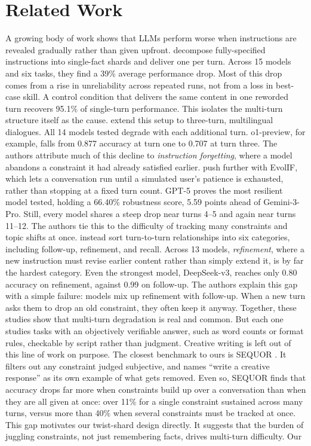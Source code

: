 \section{Related Work}
\label{sec:related_work}

A growing body of work shows that LLMs perform worse when instructions are revealed gradually rather than given upfront. \citet{laban2025llmslostmultiturnconversation} decompose fully-specified instructions into single-fact shards and deliver one per turn. Across 15 models and six tasks, they find a 39\% average performance drop. Most of this drop comes from a rise in unreliability across repeated runs, not from a loss in best-case skill. A control condition that delivers the same content in one reworded turn recovers 95.1\% of single-turn performance. This isolates the multi-turn structure itself as the cause. \citet{he2024multiifbenchmarkingllmsmultiturn} extend this setup to three-turn, multilingual dialogues. All 14 models tested degrade with each additional turn. o1-preview, for example, falls from 0.877 accuracy at turn one to 0.707 at turn three. The authors attribute much of this decline to \textit{instruction forgetting}, where a model abandons a constraint it had already satisfied earlier. \citet{jia2026battleanotherprobingllms} push further with EvolIF, which lets a conversation run until a simulated user's patience is exhausted, rather than stopping at a fixed turn count. GPT-5 proves the most resilient model tested, holding a 66.40\% robustness score, 5.59 points ahead of Gemini-3-Pro. Still, every model shares a steep drop near turns 4--5 and again near turns 11--12. The authors tie this to the difficulty of tracking many constraints and topic shifts at once. \citet{li2025structflowbenchstructuredflowbenchmark} instead sort turn-to-turn relationships into six categories, including follow-up, refinement, and recall. Across 13 models, \textit{refinement}, where a new instruction must revise earlier content rather than simply extend it, is by far the hardest category. Even the strongest model, DeepSeek-v3, reaches only 0.80 accuracy on refinement, against 0.99 on follow-up. The authors explain this gap with a simple failure: models mix up refinement with follow-up. When a new turn asks them to drop an old constraint, they often keep it anyway. Together, these studies show that multi-turn degradation is real and common. But each one studies tasks with an objectively verifiable answer, such as word counts or format rules, checkable by script rather than judgment. Creative writing is left out of this line of work on purpose. The closest benchmark to ours is SEQUOR \citep{canaverde2026sequormultiturnbenchmarkrealistic}. It filters out any constraint judged subjective, and names ``write a creative response'' as its own example of what gets removed. Even so, SEQUOR finds that accuracy drops far more when constraints build up over a conversation than when they are all given at once: over 11\% for a single constraint sustained across many turns, versus more than 40\% when several constraints must be tracked at once. This gap motivates our twist-shard design directly. It suggests that the burden of juggling constraints, not just remembering facts, drives multi-turn difficulty. Our 